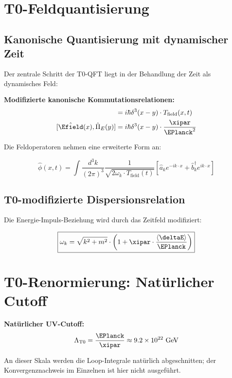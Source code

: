 	\section{T0-Feldquantisierung}
	
	\subsection{Kanonische Quantisierung mit dynamischer Zeit}
	
	Der zentrale Schritt der T0-QFT liegt in der Behandlung der Zeit als dynamisches Feld:
	
	\begin{tcolorbox}[colback=green!5!white,colframe=green!75!black,title=T0-Kanonische Quantisierung]
		\textbf{Modifizierte kanonische Kommutationsrelationen:}
		\begin{align}
			[\hat{\phi}(x), \hat{\pi}(y)] &= i\hbar \delta^3(x-y) \cdot T_{\text{field}}(x,t) \\
			[\hat{\Efield}(x), \hat{\Pi}_E(y)] &= i\hbar \delta^3(x-y) \cdot \frac{\xipar}{\EPlanck^2}
		\end{align}
	\end{tcolorbox}
	
	Die Feldoperatoren nehmen eine erweiterte Form an:
	
	\begin{equation}
		\hat{\phi}(x,t) = \int \frac{d^3k}{(2\pi)^3} \frac{1}{\sqrt{2\omega_k \cdot T_{\text{field}}(t)}} \left[\hat{a}_k e^{-ik \cdot x} + \hat{b}^\dagger_k e^{ik \cdot x}\right]
	\end{equation}
	
	\subsection{T0-modifizierte Dispersionsrelation}
	
	Die Energie-Impuls-Beziehung wird durch das Zeitfeld modifiziert:
	
	\begin{equation}
		\boxed{\omega_k = \sqrt{k^2 + m^2} \cdot \left(1 + \xipar \cdot \frac{\langle\deltaE\rangle}{\EPlanck}\right)}
	\end{equation}
	
	\section{T0-Renormierung: Natürlicher Cutoff}
	
	\begin{tcolorbox}[colback=red!5!white,colframe=red!75!black,title=T0-Renormierung]
		\textbf{Natürlicher UV-Cutoff:}
		\begin{equation}
			\Lambda_{\text{T0}} = \frac{\EPlanck}{\xipar} \approx 9.2 \times 10^{22} \text{ GeV}
		\end{equation}

		
		An dieser Skala werden die Loop-Integrale natürlich abgeschnitten; der Konvergenznachweis im Einzelnen ist hier nicht ausgeführt.
	\end{tcolorbox}
	
